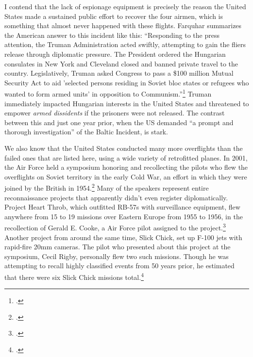 \documentclass[12pt]{article}
\begin{document}
I contend that the lack of espionage equipment is precisely the reason the United States made a sustained public effort to recover the four airmen, which is something that almost never happened with these flights. Farquhar summarizes the American answer to this incident like this: ``Responding to the press attention, the Truman Administration acted swiftly, attempting to gain the fliers release through diplomatic pressure. The President ordered the Hungarian consulates in New York and Cleveland closed and banned private travel to the country. Legislatively, Truman asked Congress to pass a \$100 million Mutual Security Act to aid 'selected persons residing in Soviet bloc states or refugees who wanted to form armed units' in opposition to Communism.''\footcite[p.~43]{farquhar_aerial_2015} Truman immediately impacted Hungarian interests in the United States and threatened to empower \emph{armed dissidents} if the prisoners were not released. The contrast between this and just one year prior, when the US demanded ``a prompt and thorough investigation'' of the Baltic Incident, is stark.

We also know that the United States conducted many more overflights than the failed ones that are listed here, using a wide variety of retrofitted planes. In 2001, the Air Force held a symposium honoring and recollecting the pilots who flew the overflights on Soviet territory in the early Cold War, an effort in which they were joined by the British in 1954.\footcite[p.~v]{hall_early_2003} Many of the speakers represent entire reconnaissance projects that apparently didn't even register diplomatically. Project Heart Throb, which outfitted RB-57s with surveillance equipment, flew anywhere from 15 to 19 missions over Eastern Europe from 1955 to 1956, in the recollection of Gerald E. Cooke, a Air Force pilot assigned to the project.\footcite[p.~194]{hall_early_2003} Another project from around the same time, Slick Chick, set up F-100 jets with rapid-fire 20mm cameras. The pilot who presented about this project at the symposium, Cecil Rigby, personally flew two such missions. Though he was attempting to recall highly classified events from 50 years prior, he estimated that there were six Slick Chick missions total.\footcite[p.~176]{hall_early_2003}
\end{document}

